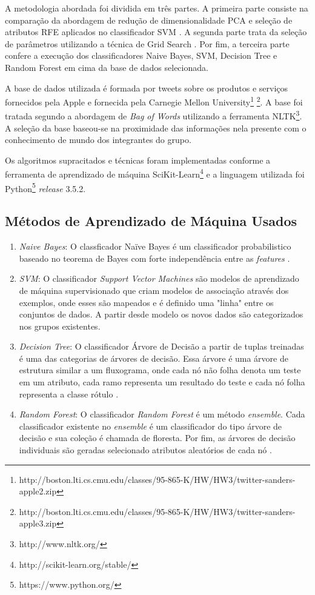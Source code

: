 A metodologia abordada foi dividida em três partes. A primeira parte consiste na comparação da abordagem de redução de dimensionalidade PCA \cite{Jolliffe:2002} e seleção de atributos RFE \cite{Guyon2003} aplicados no classificador SVM \cite{MachineLearning:Michalski:2013}. A segunda parte trata da seleção de parâmetros utilizando a técnica de Grid Search \cite{SnoekLA12}. Por fim, a terceira parte confere a execução dos classificadores Naive Bayes, SVM, Decision Tree e Random Forest \cite{MachineLearning:Michalski:2013} em cima da base de dados selecionada.

A base de dados utilizada é formada por tweets sobre os produtos e serviços fornecidos pela Apple e fornecida pela Carnegie Mellon University\footnote{http://boston.lti.cs.cmu.edu/classes/95-865-K/HW/HW3/twitter-sanders-apple2.zip} \footnote{http://boston.lti.cs.cmu.edu/classes/95-865-K/HW/HW3/twitter-sanders-apple3.zip}. A base foi tratada segundo a abordagem de \textit{Bag of Words} utilizando a ferramenta NLTK\footnote{http://www.nltk.org/}. A seleção da base baseou-se na proximidade das informações nela presente com o conhecimento de mundo dos integrantes do grupo.

Os algoritmos supracitados e técnicas foram implementadas conforme a ferramenta de aprendizado de máquina SciKit-Learn\footnote{http://scikit-learn.org/stable/} e a linguagem utilizada foi Python\footnote{https://www.python.org/} \textit{release} 3.5.2.

\subsection{Métodos de Aprendizado de Máquina Usados}
\begin{enumerate}
	\item \textit{Naive Bayes}: O classficador Naïve Bayes é um classificador probabilistico baseado no teorema de Bayes com forte independência entre as \textit{features} \cite{Han2005}.
	\item \textit{SVM}: O classificador \textit{Support Vector Machines} são modelos de aprendizado de máquina supervisionado que criam modelos de associação através dos exemplos, onde esses são mapeados e é definido uma "linha" entre os conjuntos de dados. A partir desde modelo os novos dados são categorizados nos grupos existentes.
	\item \textit{Decision Tree}: O classificador Árvore de Decisão a partir de tuplas treinadas é uma das categorias de árvores de decisão. Essa árvore é uma árvore de estrutura similar a um fluxograma, onde cada nó não folha denota um teste em um atributo, cada ramo representa um resultado do teste e cada nó folha representa a classe rótulo \cite{Han2005}.
	\item \textit{Random Forest}: O classificador \textit{Random Forest} é um método \textit{ensemble}. Cada classificador existente no \textit{ensemble} é um classificador do tipo árvore de decisão e sua coleção é chamada de floresta. Por fim, as árvores de decisão individuais são geradas selecionado atributos aleatórios de cada nó \cite{Han2005}.
\end{enumerate}

